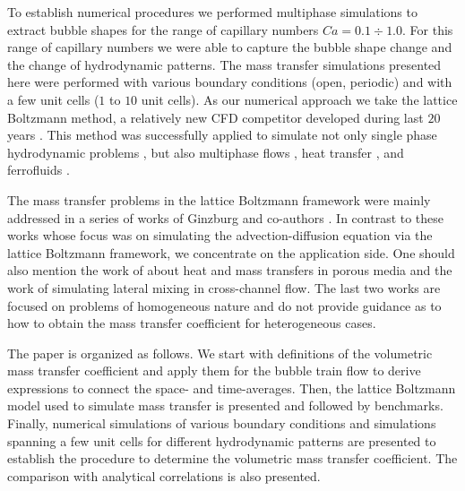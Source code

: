 \documentclass{article}
\begin{document}
To establish numerical procedures we performed multiphase simulations
to extract bubble shapes
\cite{kuzmin-binary2d,kuzmin-binary3d} for the range of capillary numbers
$Ca=0.1\div 1.0$. For this range of capillary numbers
we were able to capture the bubble shape change and the change of hydrodynamic
patterns. The mass transfer simulations presented here were performed with various boundary
conditions (open, periodic) and with a few unit cells ($1$ to $10$ unit cells).
As our numerical approach we take the lattice Boltzmann method, a relatively
new CFD competitor developed during last $20$ years
\cite{frisch,mcnamara,HJ,HSB}. This method was successfully applied to simulate
not only single phase hydrodynamic problems \cite{yu}, but also multiphase
flows \cite{Shan-chen:extended,swift,gunstensen}, heat transfer
\cite{yuan-thermal,zhang-thermal}, and ferrofluids \cite{dellar-ferro,kuzmin-aniso}.

The mass transfer problems in the lattice Boltzmann framework were mainly
addressed in a series of works of Ginzburg and co-authors
\cite{ginzburg-main,ginzburg-boundary-conditions,ginzburg-saturated-flow}.
In contrast to these works whose focus was on simulating the
advection-diffusion equation via the lattice Boltzmann framework, we concentrate
on the application side.  One should also mention the work of \citet{inamuro-scalar-boundary}
about heat and mass transfers in porous media and the work of
\citet{jos-mass} simulating lateral mixing in cross-channel flow.  The last two
works are focused on problems of homogeneous nature and do not provide
guidance as to how to obtain the mass transfer coefficient for heterogeneous cases.

The paper is organized as follows. We start with definitions of the volumetric mass transfer coefficient and apply them 
for the bubble train flow to derive expressions to connect the space- and time-averages.  Then, the lattice
Boltzmann model used to simulate mass transfer is presented and followed by benchmarks. Finally,
numerical simulations of various boundary conditions and simulations spanning a few unit cells for
different hydrodynamic patterns are presented to establish the procedure to determine the
volumetric mass transfer coefficient. The comparison with analytical correlations is also presented.
\end{document}
